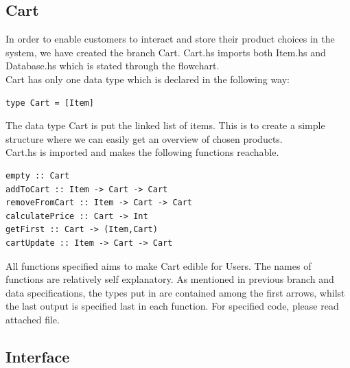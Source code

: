 \documentclass[11pt]{article}
\begin{document}
\subsection{Cart}
In order to enable customers to interact and store their product choices in the system, we have created the branch Cart. Cart.hs imports both Item.hs and Database.hs which is stated through the flowchart.\\
Cart has only one data type which is declared in the following way:\\
\begin{lstlisting}
type Cart = [Item]
\end{lstlisting}
The data type Cart is put the linked list of items. This is to create a simple structure where we can easily get an overview of chosen products.\\
Cart.hs is imported and makes the following functions reachable.\\
\begin{lstlisting}
empty :: Cart
addToCart :: Item -> Cart -> Cart
removeFromCart :: Item -> Cart -> Cart
calculatePrice :: Cart -> Int
getFirst :: Cart -> (Item,Cart)
cartUpdate :: Item -> Cart -> Cart
\end{lstlisting}
All functions specified aims to make Cart edible for Users. The names of functions are relatively self explanatory. As mentioned in previous branch and data specifications, the types put in are contained among the first arrows, whilst the last output is specified last in each function. For specified code, please read attached file.
\subsection{Interface}
\end{document}
